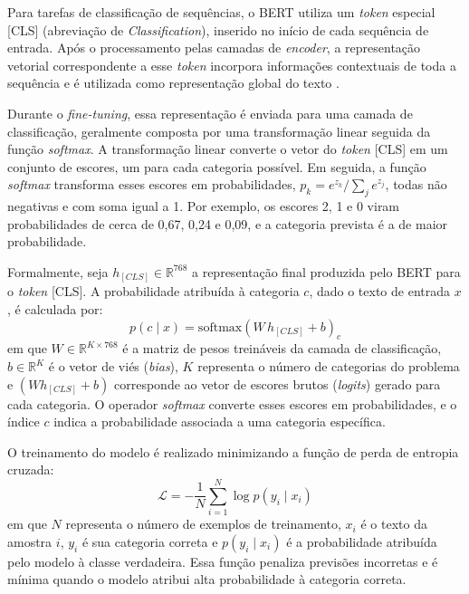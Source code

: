 \documentclass[
    12pt,                %
    openright,           %
    oneside,             %
    a4paper,             %
    english,             %
    brazil               %
]{abntex2}
\begin{document}
\label{subsubsec:bert_cls}

Para tarefas de classificação de sequências, o BERT utiliza um \textit{token} especial [CLS] (abreviação de \textit{Classification}), inserido no início de cada sequência de entrada. Após o processamento pelas camadas de \textit{encoder}, a representação vetorial correspondente a esse \textit{token} incorpora informações contextuais de toda a sequência e é utilizada como representação global do texto \cite{devlin2019}.

Durante o \textit{fine-tuning}, essa representação é enviada para uma camada de classificação, geralmente composta por uma transformação linear seguida da função \textit{softmax}. A transformação linear converte o vetor do \textit{token} [CLS] em um conjunto de escores, um para cada categoria possível. Em seguida, a função \textit{softmax} transforma esses escores em probabilidades, $p_k = e^{z_k} / \sum_{j} e^{z_j}$, todas não negativas e com soma igual a 1. Por exemplo, os escores 2, 1 e 0 viram probabilidades de cerca de 0,67, 0,24 e 0,09, e a categoria prevista é a de maior probabilidade.

Formalmente, seja $h_{[CLS]} \in \mathbb{R}^{768}$ a representação final produzida pelo BERT para o \textit{token} [CLS]. A probabilidade atribuída à categoria $c$, dado o texto de entrada $x$, é calculada por:
\begin{equation}
p(c \mid x) = \mathrm{softmax}\!\left( W\, h_{[CLS]} + b \right)_c
\label{eq:cabeca}
\end{equation}
em que $W \in \mathbb{R}^{K \times 768}$ é a matriz de pesos treináveis da camada de classificação, $b \in \mathbb{R}^{K}$ é o vetor de viés (\textit{bias}), $K$ representa o número de categorias do problema e $(W h_{[CLS]} + b)$ corresponde ao vetor de escores brutos (\textit{logits}) gerado para cada categoria. O operador \textit{softmax} converte esses escores em probabilidades, e o índice $c$ indica a probabilidade associada a uma categoria específica.

O treinamento do modelo é realizado minimizando a função de perda de entropia cruzada:
\begin{equation}
\mathcal{L} = -\frac{1}{N} \sum_{i=1}^{N} \log p(y_i \mid x_i)
\label{eq:entropia}
\end{equation}
em que $N$ representa o número de exemplos de treinamento, $x_i$ é o texto da amostra $i$, $y_i$ é sua categoria correta e $p(y_i \mid x_i)$ é a probabilidade atribuída pelo modelo à classe verdadeira. Essa função penaliza previsões incorretas e é mínima quando o modelo atribui alta probabilidade à categoria correta.
\end{document}
